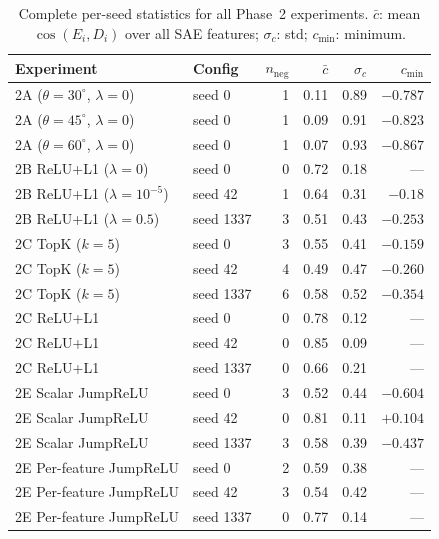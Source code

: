 \documentclass[11pt,a4paper]{article}
\newcommand{\cosED}{\cos(E_i, D_i)}
\newcommand{\nneg}{n_{\mathrm{neg}}}
\begin{document}
\begin{table}[H]
\centering
\caption{Complete per-seed statistics for all Phase~2 experiments.
$\bar{c}$: mean $\cosED$ over all SAE features; $\sigma_c$: std; $c_{\min}$: minimum.}
\label{tab:allstats}
\begin{tabular}{@{}llrrrr@{}}
\toprule
Experiment & Config & $\nneg$ & $\bar{c}$ & $\sigma_c$ & $c_{\min}$\\
\midrule
2A ($\theta=30^\circ$, $\lambda=0$) & seed 0 & 1 & 0.11 & 0.89 & $-0.787$\\
2A ($\theta=45^\circ$, $\lambda=0$) & seed 0 & 1 & 0.09 & 0.91 & $-0.823$\\
2A ($\theta=60^\circ$, $\lambda=0$) & seed 0 & 1 & 0.07 & 0.93 & $-0.867$\\
\midrule
2B ReLU+L1 ($\lambda{=}0$) & seed 0 & 0 & 0.72 & 0.18 & ---\\
2B ReLU+L1 ($\lambda{=}10^{-5}$) & seed 42 & 1 & 0.64 & 0.31 & $-0.18$\\
2B ReLU+L1 ($\lambda{=}0.5$) & seed 1337 & 3 & 0.51 & 0.43 & $-0.253$\\
\midrule
2C TopK ($k{=}5$) & seed 0 & 3 & 0.55 & 0.41 & $-0.159$\\
2C TopK ($k{=}5$) & seed 42 & 4 & 0.49 & 0.47 & $-0.260$\\
2C TopK ($k{=}5$) & seed 1337 & 6 & 0.58 & 0.52 & $-0.354$\\
2C ReLU+L1 & seed 0 & 0 & 0.78 & 0.12 & ---\\
2C ReLU+L1 & seed 42 & 0 & 0.85 & 0.09 & ---\\
2C ReLU+L1 & seed 1337 & 0 & 0.66 & 0.21 & ---\\
\midrule
2E Scalar JumpReLU & seed 0 & 3 & 0.52 & 0.44 & $-0.604$\\
2E Scalar JumpReLU & seed 42 & 0 & 0.81 & 0.11 & $+0.104$\\
2E Scalar JumpReLU & seed 1337 & 3 & 0.58 & 0.39 & $-0.437$\\
2E Per-feature JumpReLU & seed 0 & 2 & 0.59 & 0.38 & ---\\
2E Per-feature JumpReLU & seed 42 & 3 & 0.54 & 0.42 & ---\\
2E Per-feature JumpReLU & seed 1337 & 0 & 0.77 & 0.14 & ---\\
\bottomrule
\end{tabular}
\end{table}
\end{document}
